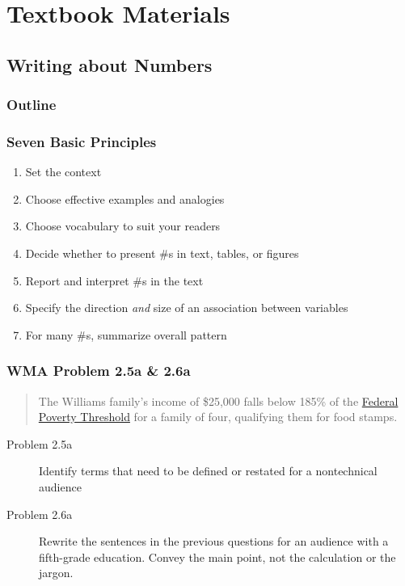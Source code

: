 \section{Textbook Materials}

\subsection{Writing about Numbers}

\begin{frame}
    \frametitle{Outline}
\end{frame}
\begin{frame}
    \frametitle{Seven Basic Principles}
     \begin{enumerate}
         \item Set the context 
         \item Choose effective examples and analogies
         \item Choose vocabulary to suit your readers
         \item Decide whether to present \#s in text, tables, or figures
         \item Report and interpret \#s in the text
         \item Specify the direction \emph{and} size of an association between variables
         \item For many \#s, summarize overall pattern 
     \end{enumerate}
\end{frame}

\begin{frame}
    \frametitle{WMA Problem 2.5a \& 2.6a}
        \begin{verse}
            The Williams family's income of \$25,000 falls below 185\% of the 
            \href{http://aspe.hhs.gov/poverty/12poverty.shtml}{Federal Poverty
            Threshold} for a family of four, qualifying them
            for food stamps. 
        \end{verse}
        \vskip0.3in
\begin{description}
    \item[Problem 2.5a] {Identify terms that need to be defined or restated
        for a nontechnical audience}
    \item[Problem 2.6a] Rewrite the sentences in the previous questions for an
        audience with a fifth-grade education.  Convey the main point,
        not the calculation or the jargon. 
\end{description}
        
\end{frame}

